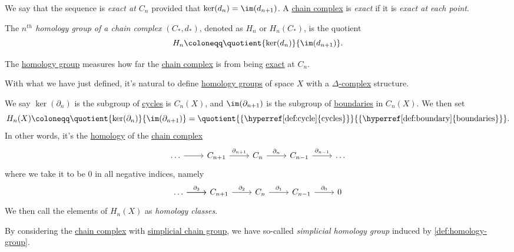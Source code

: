 \begin{definition}[Exact]\label{def:exact}
	We say that the sequence is \emph{exact at \(C_{n} \)} provided that \(\ker (d_{n}) = \im (d_{n+1})\). A \hyperref[def:chain-complex]{chain complex} is \emph{exact}
	if it is \emph{exact at each point}.
\end{definition}

\begin{definition}\label{def:homology-group}
	The \emph{\(n^{th} \) homology group of a chain complex \((C_\ast, d_\ast)\)}, denoted as \(H_{n} \) or \(H_{n} (C_\ast)\), is the quotient
	\[
		H_{n} \coloneqq \quotient{\ker  (d_{n} )}{\im  (d_{n+1})}.
	\]
\end{definition}
\begin{remark}
	The \hyperref[def:homology-group]{homology group} measures how far the \hyperref[def:chain-complex]{chain complex} is from being \hyperref[def:exact]{exact} at \(C_{n} \).
\end{remark}

With what we have just defined, it's natural to define \hyperref[def:homology-group]{homology groups} of space \(X\) with a \hyperref[def:delta-complex]{\(\Delta \)-complex}
structure.
\begin{definition}\label{def:homology-class}
	We say \(\ker  (\partial _{n} )\) is the subgroup of \hyperref[def:cycle]{cycles} is \(C_{n} (X)\), and \(\im (\partial_{n+1}) \) is the
	subgroup of \hyperref[def:boundary]{boundaries} in \(C_{n} (X)\). We then set
	\[
		H_{n} (X)\coloneqq \quotient{\ker  (\partial _{n} )}{\im  (\partial _{n+1})} = \quotient{\{\text{\hyperref[def:cycle]{cycles}}\}}{\{\text{\hyperref[def:boundary]{boundaries}}\}}.
	\]
	In other words, it's the \hyperref[def:homology-group]{homology} of the \hyperref[def:chain-complex]{chain complex}
	\[
		\begin{tikzcd}
			\ldots & {C_{n+1}} & {C_{n}} & {C_{n-1}} & \ldots
			\arrow[from=1-1, to=1-2]
			\arrow["{\partial_{n+1}}", from=1-2, to=1-3]
			\arrow["{\partial_{n}}", from=1-3, to=1-4]
			\arrow["{\partial_{n-1}}", from=1-4, to=1-5]
		\end{tikzcd}
	\]
	where we take it to be \(0\) in all negative indices, namely
	\[
		\begin{tikzcd}
			\ldots & {C_{n+1}} & {C_{n}} & {C_{n-1}} & 0
			\arrow[from=1-1, to=1-2]
			\arrow["{\partial_{3}}", from=1-1, to=1-2]
			\arrow["{\partial_{2}}", from=1-2, to=1-3]
			\arrow["{\partial_{1}}", from=1-3, to=1-4]
			\arrow["{\partial_{0}}", from=1-4, to=1-5]
		\end{tikzcd}
	\]
	We then call the elements of \(H_{n} (X)\) as \emph{homology classes}.
\end{definition}

\begin{definition}\label{def:simplicial-homology-group}
	By considering the \hyperref[def:chain-complex]{chain complex} with \hyperref[def:simplicial-chain-group]{simplicial chain group},
	we have so-called \emph{simplicial homology group} induced by \autoref{def:homology-group}.
\end{definition}